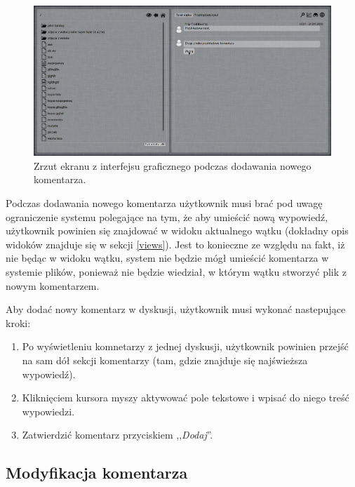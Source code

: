 \documentclass[polish,a4paper,twoside]{ppfcmthesis}
\begin{document}
\begin{figure}[h!]
  \vspace{5pt}
  \begin{center}
    \includegraphics[width=400pt]{figures/screenshotnewcomment1.png}
  \end{center}
  \caption{Zrzut ekranu z interfejsu graficznego podczas dodawania nowego komentarza.}
\end{figure}

Podczas dodawania nowego komentarza użytkownik musi brać pod uwagę ograniczenie systemu polegające na tym, że aby umieścić nową wypowiedź, użytkownik powinien się znajdować w widoku aktualnego wątku (dokładny opis widoków znajduje się w sekcji \ref{views}). Jest to konieczne ze względu na fakt, iż nie będąc w widoku wątku, system nie będzie mógł umieścić komentarza w systemie plików, ponieważ nie będzie wiedział, w którym wątku stworzyć plik z nowym komentarzem.

Aby dodać nowy komentarz w dyskusji, użytkownik musi wykonać nastepujące kroki:

\begin{enumerate}[noitemsep]
  \item Po wyświetleniu komnetarzy z jednej dyskusji, użytkownik powinien przejść na sam dół sekcji komentarzy (tam, gdzie znajduje się najświeższa wypowiedź).
  
  \item Kliknięciem kursora myszy aktywować pole tekstowe i wpisać do niego treść wypowiedzi.
  
  \item Zatwierdzić komentarz przyciskiem ,,\emph{Dodaj}''.
\end{enumerate}

\subsection*{Modyfikacja komentarza}
\end{document}
